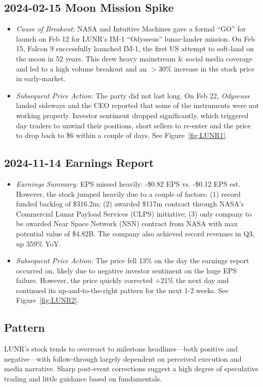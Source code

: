 \documentclass[11pt]{article}
\begin{document}
    \subsection{2024-02-15 Moon Mission Spike}
        \begin{itemize}
            \item \textit{Cause of Breakout:} NASA and Intuitive Machines gave a formal ``GO'' for launch on Feb 12 for LUNR's IM-1 ``Odysseus'' lunar-lander mission. On Feb 15, Falcon 9 successfully launched IM-1, the first US attempt to soft-land on the moon in 52 years. This drew heavy mainstream \& social media coverage and led to a high volume breakout and an $>$30\% increase in the stock price in early-market.
            \item \textit{Subsequent Price Action:} The party did not last long. On Feb 22, \textit{Odyseuss} landed sideways and the CEO reported that some of the instruments were not working properly. Investor sentiment dropped significantly, which triggered day traders to unwind their positions, short sellers to re-enter and the price to drop back to \$6 within a couple of days. See Figure~\ref{fig:LUNR1}.
        \end{itemize}
    \subsection{2024-11-14 Earnings Report}
        \begin{itemize}
            \item \textit{Earnings Summary:} EPS missed heavily: -\$0.82 EPS vs. -\$0.12 EPS est. However, the stock jumped heavily due to a couple of factors: (1) record funded backlog of \$316.2m; (2) awarded \$117m contract through NASA's Commercial Lunar Payload Services (CLPS) initiative; (3) only company to be awarded Near Space Network (NSN) contract from NASA with max potential value of \$4.82B. The company also achieved record revenues in Q3, up 359\% YoY.
            \item \textit{Subsequent Price Action:} The price fell 13\% on the day the earnings report occurred on, likely due to negative investor sentiment on the huge EPS failure. However, the price quickly corrected +21\% the next day and continued its up-and-to-the-right pattern for the next 1-2 weeks. See Figure~\ref{fig:LUNR2}.
        \end{itemize}
        \subsection{Pattern}
        LUNR’s stock tends to overreact to milestone headlines—both positive and negative—with follow-through largely dependent on perceived execution and media narrative. Sharp post-event corrections suggest a high degree of speculative trading and little guidance based on fundamentals.
\end{document}
